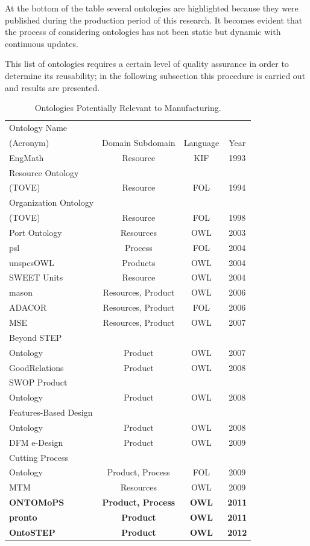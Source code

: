 At the bottom of the table several ontologies are highlighted because they were published during the production period of this research. It becomes evident that the process of considering ontologies has not been static but dynamic with continuous updates. 

This list of ontologies requires a certain level of quality assurance in order to determine its reusability; in the following subsection this procedure is carried out and results are presented.


\begin{table}[tp]%
	\caption{Ontologies Potentially Relevant to Manufacturing.}
	\scriptsize
	\label{table4.1}\centering %
	\begin{tabular}{lccc}
		\toprule %
		Ontology Name \\ (Acronym)	& Domain  Subdomain	& Language	& Year \\\toprule
		EngMath	& Resource	& KIF	& 1993 \\
		Resource Ontology \\ (TOVE)&	Resource &	FOL	& 1994 \\
		Organization Ontology \\ (TOVE)	& Resource&	FOL &	1998 \\
		Port Ontology &	Resources&	OWL&	2003 \\
		\gls{psl}&	Process &	FOL&	2004 \\
		unspcsOWL&	Products&	OWL&	2004 \\
		SWEET Units&	Resource&	OWL	&2004 \\
		\gls{mason}&	Resources, Product&	OWL	&2006 \\
		ADACOR&	Resources, Product&	FOL	&2006 \\
		MSE	&Resources, Product	&OWL	&2007 \\
		Beyond STEP \\ Ontology &	Product&	OWL	&2007 \\
		GoodRelations &	Product	&OWL&	2008 \\
		SWOP Product  \\ Ontology&	Product&	OWL&	2008 \\
		Features-Based Design \\ Ontology&	Product	&OWL&	2008 \\
		DFM e-Design &	Product	&OWL&	2009 \\
		Cutting Process \\ Ontology&	Product, Process&	FOL &	2009 \\
		MTM	&Resources&	OWL	&2009 \\
		\textbf{ONTOMoPS}&	\textbf{Product, Process}&	\textbf{OWL}&	\textbf{2011} \\
		\textbf{\gls{pronto}}	&\textbf{Product}&	\textbf{OWL}&	\textbf{2011} \\
		\textbf{OntoSTEP}&	\textbf{Product}	&\textbf{OWL}&	\textbf{2012} \\
	\end{tabular}
\end{table}



